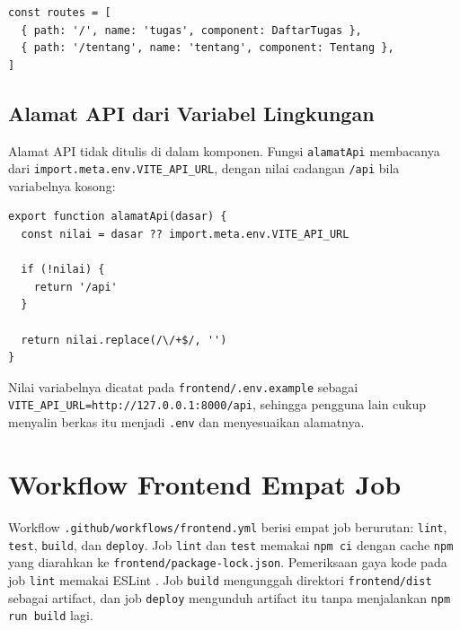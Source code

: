 \documentclass[a4paper,oneside,12pt]{report}
\begin{document}
\begin{lstlisting}[style=jsstyle,caption={Pemetaan rute halaman.}]
const routes = [
  { path: '/', name: 'tugas', component: DaftarTugas },
  { path: '/tentang', name: 'tentang', component: Tentang },
]
\end{lstlisting}

\subsection{Alamat API dari Variabel Lingkungan}
Alamat API tidak ditulis di dalam komponen. Fungsi \texttt{alamatApi} membacanya dari \texttt{import.meta.env.VITE\_API\_URL}, dengan nilai cadangan \texttt{/api} bila variabelnya kosong:

\begin{lstlisting}[style=jsstyle,caption={Pembacaan alamat API dari variabel lingkungan.}]
export function alamatApi(dasar) {
  const nilai = dasar ?? import.meta.env.VITE_API_URL

  if (!nilai) {
    return '/api'
  }

  return nilai.replace(/\/+$/, '')
}
\end{lstlisting}

Nilai variabelnya dicatat pada \texttt{frontend/.env.example} sebagai \texttt{VITE\_API\_URL=http://127.0.0.1:8000/api}, sehingga pengguna lain cukup menyalin berkas itu menjadi \texttt{.env} dan menyesuaikan alamatnya.

\section{Workflow Frontend Empat Job}
Workflow \texttt{.github/workflows/frontend.yml} berisi empat job berurutan: \texttt{lint}, \texttt{test}, \texttt{build}, dan \texttt{deploy}. Job \texttt{lint} dan \texttt{test} memakai \texttt{npm ci} dengan cache \texttt{npm} yang diarahkan ke \texttt{frontend/package-lock.json}. Pemeriksaan gaya kode pada job \texttt{lint} memakai ESLint \cite{eslint-docs}. Job \texttt{build} mengunggah direktori \texttt{frontend/dist} sebagai artifact, dan job \texttt{deploy} mengunduh artifact itu tanpa menjalankan \texttt{npm run build} lagi.
\end{document}
